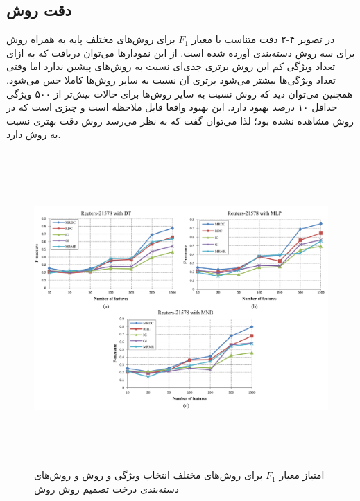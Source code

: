 \subsection{دقت روش }
در تصویر ۴-۲ دقت متناسب با معیار $F_1$ برای روش‌های مختلف پایه به همراه روش  برای سه روش دسته‌بندی آورده شده است. از این نمودارها می‌توان دریافت که به ازای تعداد ویژگی کم این روش برتری جدی‌ای نسبت به روش‌های پیشین ندارد اما وقتی تعداد ویژگی‌ها بیشتر می‌شود برتری آن نسبت به سایر روش‌ها کاملا حس می‌شود. همچنین می‌توان دید که روش  نسبت به سایر روش‌ها برای حالات بیش‌تر از ۵۰۰ ویژگی حداقل ۱۰ درصد بهبود دارد. این بهبود واقعا قابل ملاحظه است و چیزی است که در روش  مشاهده نشده بود؛ لذا می‌توان گفت که به نظر می‌رسد روش  دقت بهتری نسبت به روش  دارد.

\begin{figure}[!h]
\includegraphics[height=12cm]{MRDC1.png}
\caption{امتیاز معیار $F_1$ برای روش‌های مختلف انتخاب ویژگی و روش  و روش‌های دسته‌بندی  درخت تصمیم  روش   روش  \cite{labani2018novel} }
\end{figure}